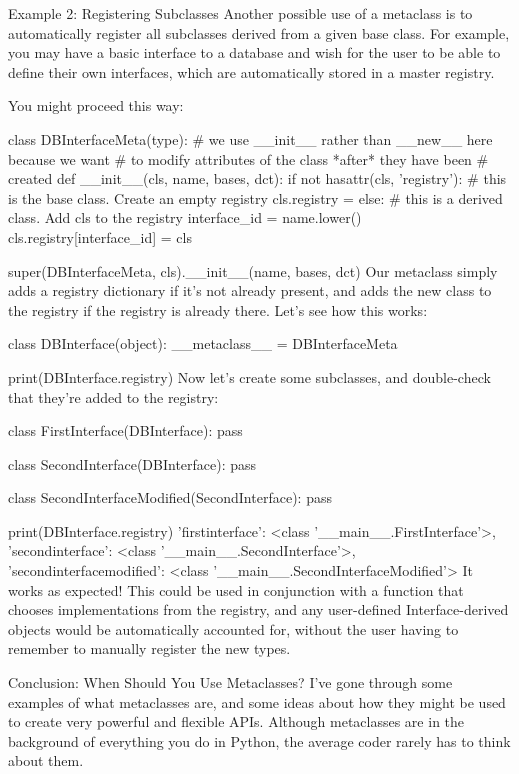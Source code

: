 Example 2: Registering Subclasses
Another possible use of a metaclass is to automatically register all subclasses derived from a given base class. For example, you may have a basic interface to a database and wish for the user to be able to define their own interfaces, which are automatically stored in a master registry.

You might proceed this way:

class DBInterfaceMeta(type):
    # we use __init__ rather than __new__ here because we want
    # to modify attributes of the class *after* they have been
    # created
    def __init__(cls, name, bases, dct):
        if not hasattr(cls, 'registry'):
            # this is the base class.  Create an empty registry
            cls.registry = {}
        else:
            # this is a derived class.  Add cls to the registry
            interface_id = name.lower()
            cls.registry[interface_id] = cls

        super(DBInterfaceMeta, cls).__init__(name, bases, dct)
Our metaclass simply adds a registry dictionary if it's not already present, and adds the new class to the registry if the registry is already there. Let's see how this works:

class DBInterface(object):
    __metaclass__ = DBInterfaceMeta

print(DBInterface.registry)
{}
Now let's create some subclasses, and double-check that they're added to the registry:

class FirstInterface(DBInterface):
    pass

class SecondInterface(DBInterface):
    pass

class SecondInterfaceModified(SecondInterface):
    pass

print(DBInterface.registry)
{'firstinterface': <class '__main__.FirstInterface'>, 'secondinterface': <class '__main__.SecondInterface'>, 'secondinterfacemodified': <class '__main__.SecondInterfaceModified'>}
It works as expected! This could be used in conjunction with a function that chooses implementations from the registry, and any user-defined Interface-derived objects would be automatically accounted for, without the user having to remember to manually register the new types.

Conclusion: When Should You Use Metaclasses?
I've gone through some examples of what metaclasses are, and some ideas about how they might be used to create very powerful and flexible APIs. Although metaclasses are in the background of everything you do in Python, the average coder rarely has to think about them.

